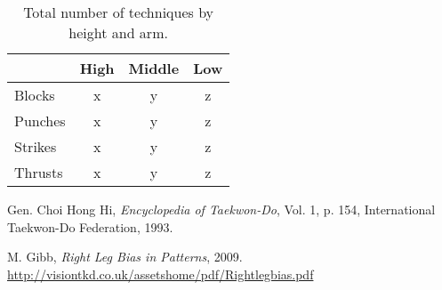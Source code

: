 \documentclass[10pt,twocolumn,a4paper]{article}
\begin{document}
\begin{table}
  \centering
  \begin{tabular}{l|c|c|c} \hline \hline
    & High & Middle & Low \\ \hline

    Blocks    & x   & y   & z \\
    Punches   & x   & y   & z \\
    Strikes   & x   & y   & z \\
    Thrusts   & x   & y   & z \\
    \hline

  \end{tabular}
  \caption{Total number of techniques by height and arm.}
  \end{table}







\begin{thebibliography}{99}
    \small  %

      Gen. Choi Hong Hi,
      \emph{Encyclopedia of Taekwon-Do}, Vol. 1, p. 154,
      International Taekwon-Do Federation, 1993.

      M. Gibb,
      \emph{Right Leg Bias in Patterns}, 2009.
      \url{http://visiontkd.co.uk/assetshome/pdf/Rightlegbias.pdf}













\end{thebibliography}
\end{document}
